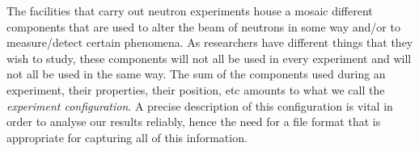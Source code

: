 The facilities that carry out neutron experiments house a mosaic different components that are used to alter the beam of neutrons in some way and/or to measure/detect certain phenomena. As researchers have different things that they wish to study, these components will not all be used in every experiment and will not all be used in the same way. The sum of the components used during an experiment, their properties, their position, etc amounts to what we call the \textit{experiment configuration}. A precise description of this configuration is vital in order to analyse our results reliably, hence the need for a file format that is appropriate for capturing all of this information.
